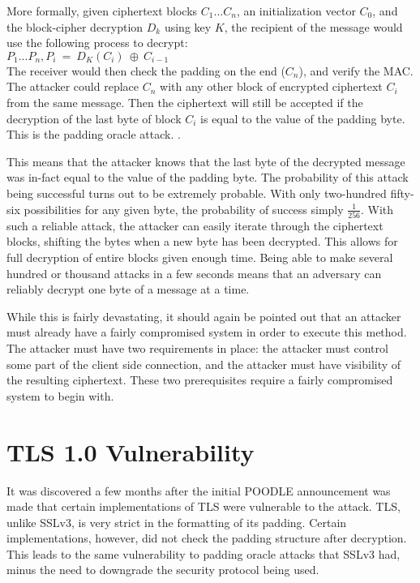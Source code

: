 \documentclass[10pt]{article}
\begin{document}
More formally, given ciphertext blocks $C_1 ... C_n$, an initialization vector
$C_0$, and the block-cipher decryption $D_k$ using key $K$, the recipient of
the message would use the following process to decrypt:\cite{POODLE}\\

\noindent $P_1 ... P_n, P_i\ =\ D_K(C_i)\ \oplus\ C_{i-1}$\\


The receiver would then check the padding on the end ($C_n$), and verify the
MAC. The attacker could replace $C_n$ with any other block of encrypted
ciphertext $C_i$ from the same message. Then the ciphertext will still be
accepted if the decryption of the last byte of block $C_i$ is equal to the
value of the padding byte. This is the padding oracle attack. \cite{POODLE}.

This means that the attacker knows that the last byte of the decrypted message
was in-fact equal to the value of the padding byte. The probability of this
attack being successful turns out to be extremely probable. With only two-hundred
fifty-six possibilities for any given byte, the probability of success simply
$\frac{1}{256}$. With such a reliable attack, the attacker can easily iterate
through the ciphertext blocks, shifting the bytes when a new byte has been
decrypted. This allows for full decryption of entire blocks given enough time.
Being able to make several hundred or thousand attacks in a few seconds means 
that an adversary can reliably decrypt one byte of a message at a time.

While this is fairly devastating, it should again be pointed out that an attacker
must already have a fairly compromised system in order to execute this method.
The attacker must have two requirements in place: the attacker must control
some part of the client side connection, and the attacker must have visibility
of the resulting ciphertext. These two prerequisites require a fairly
compromised system to begin with.\cite{US-CERT}

\section*{TLS 1.0 Vulnerability}
It was discovered a few months after the initial POODLE announcement was made
that certain implementations of TLS were vulnerable to the attack. TLS, unlike
SSLv3, is very strict in the formatting of its padding. Certain implementations,
however, did not check the padding structure after decryption. This leads to the
same vulnerability to padding oracle attacks that SSLv3 had, minus the need to
downgrade the security protocol being used.\cite{POODLEBites}
\end{document}
